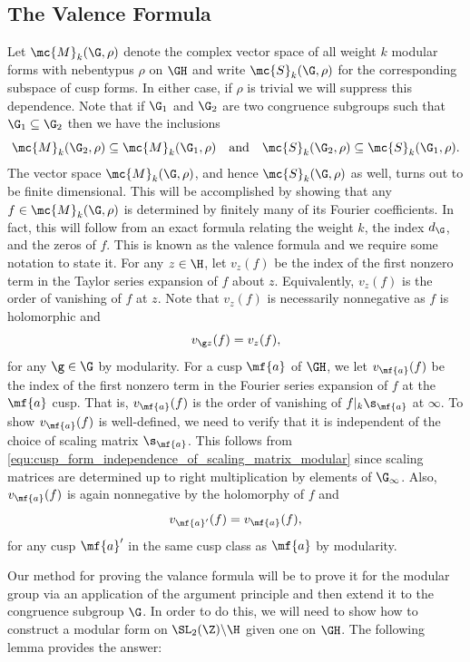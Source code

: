 \documentclass[12pt]{article}
\begin{document}
    \subsection{The Valence Formula}
      Let \(\mc{M}_{k}(\G,\rho)\) denote the complex vector space of all weight \(k\) modular forms with nebentypus \(\rho\) on \(\GH\) and write \(\mc{S}_{k}(\G,\rho)\) for the corresponding subspace of cusp forms. In either case, if \(\rho\) is trivial we will suppress this dependence. Note that if \(\G_{1}\) and \(\G_{2}\) are two congruence subgroups such that \(\G_{1} \subseteq \G_{2}\) then we have the inclusions
      \[
        \mc{M}_{k}(\G_{2},\rho) \subseteq \mc{M}_{k}(\G_{1},\rho) \quad \text{and} \quad \mc{S}_{k}(\G_{2},\rho) \subseteq \mc{S}_{k}(\G_{1},\rho).
      \]
      The vector space \(\mc{M}_{k}(\G,\rho)\), and hence \(\mc{S}_{k}(\G,\rho)\) as well, turns out to be finite dimensional. This will be accomplished by showing that any \(f \in \mc{M}_{k}(\G,\rho)\) is determined by finitely many of its Fourier coefficients. In fact, this will follow from an exact formula relating the weight \(k\), the index \(d_{\G}\), and the zeros of \(f\). This is known as the valence formula and we require some notation to state it. For any \(z \in \H\), let \(v_{z}(f)\) be the index of the first nonzero term in the Taylor series expansion of \(f\) about \(z\). Equivalently, \(v_{z}(f)\) is the order of vanishing of \(f\) at \(z\). Note that \(v_{z}(f)\) is necessarily nonnegative as \(f\) is holomorphic and
      \[
        v_{\g z}(f) = v_{z}(f),
      \]
      for any \(\g \in \G\) by modularity. For a cusp \(\mf{a}\) of \(\GH\), we let \(v_{\mf{a}}(f)\) be the index of the first nonzero term in the Fourier series expansion of \(f\) at the \(\mf{a}\) cusp. That is, \(v_{\mf{a}}(f)\) is the order of vanishing of \(f|_{k}\s_{\mf{a}}\) at \(\infty\). To show \(v_{\mf{a}}(f)\) is well-defined, we need to verify that it is independent of the choice of scaling matrix \(\s_{\mf{a}}\). This follows from \cref{equ:cusp_form_independence_of_scaling_matrix_modular} since scaling matrices are determined up to right multiplication by elements of \(\G_{\infty}\). Also, \(v_{\mf{a}}(f)\) is again nonnegative by the holomorphy of \(f\) and
      \[
        v_{\mf{a}'}(f) = v_{\mf{a}}(f),
      \]
      for any cusp \(\mf{a}'\) in the same cusp class as \(\mf{a}\) by modularity.

      Our method for proving the valance formula will be to prove it for the modular group via an application of the argument principle and then extend it to the congruence subgroup \(\G\). In order to do this, we will need to show how to construct a modular form on \(\SL_{2}(\Z)\backslash\H\) given one on \(\GH\). The following lemma provides the answer:
\end{document}
